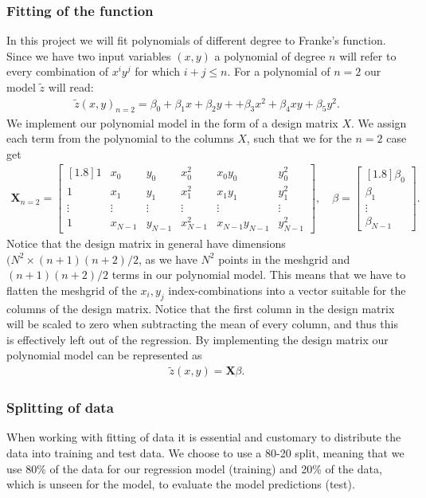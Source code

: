 \documentclass[norsk,a4paper,12pt]{scrartcl}
\renewcommand{\vec}[1]{\mathbf{#1}} %
\begin{document}
\subsubsection{Fitting of the function}
In this project we will fit polynomials of different degree to Franke's function. Since we have two input variables $(x,y)$ a polynomial of degree $n$ will refer to every combination of $x^iy^j$ for which $i+j \le n$. 
For a polynomial of $n = 2$ our model $\tilde{z}$ will read:
\begin{align*}
    \tilde{z}(x,y)_{n=2} = \beta_0 + \beta_1x + \beta_2y +  + \beta_3x^2 + \beta_4xy + \beta_5y^2.
\end{align*}
We implement our polynomial model in the form of a design matrix $X$. We assign each term from the polynomial to the columns $X$, such that we for the $n = 2$ case get
\begin{align*}
\vec{X}_{n=2} = 
    \begin{bmatrix}[1.8]
        1 & x_0 & y_0  & x_0^2 & x_0y_0 & y_0^2 \\
        1 & x_1 & y_1  & x_1^2 & x_1y_1 & y_1^2 \\
        \vdots & \vdots & \vdots & \vdots & \vdots & \vdots   \\
        1 & x_{N-1} & y_{N-1} & x_{N-1}^2 & x_{N-1}y_{N-1} & y_{N-1}^2
    \end{bmatrix}
    , \quad \beta = 
    \begin{bmatrix}[1.8]
        \beta_0  \\
        \beta_1 \\
        \vdots  \\
        \beta_{N-1}
    \end{bmatrix}.
\end{align*}
Notice that the design matrix in general have dimensions $(N^2 \times (n+1)(n+2)/2$, as we have $N^2$ points in the meshgrid and $(n+1)(n+2)/2$ terms in our polynomial model. This means that we have to flatten the meshgrid of the $x_i,y_j$ index-combinations into a vector suitable for the columns of the design matrix. Notice that the first column in the design matrix will be scaled to zero when subtracting the mean of every column, and thus this is effectively left out of the regression. By implementing the design matrix our polynomial model can be represented as
\begin{align*}
     \tilde{z}(x,y) = \vec{X}\beta.
\end{align*}
\subsubsection{Splitting of data}
When working with fitting of data it is essential and customary to distribute the data into training and test data. We choose to use a 80-20 split, meaning that we use 80\% of the data for our regression model (training) and 20\%  of the data, which is unseen for the model, to evaluate the model predictions (test).
\end{document}
